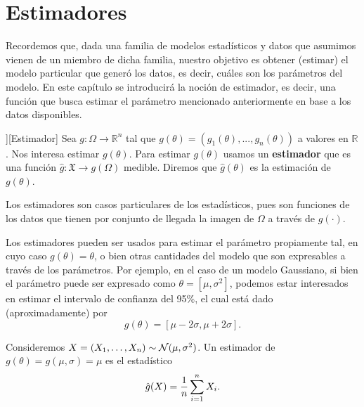\chapter{Estimadores}

Recordemos que, dada una familia de modelos estadísticos y datos que asumimos vienen de un miembro de dicha familia, nuestro objetivo es obtener (estimar) el modelo particular que generó los datos, es decir, cuáles son los parámetros del modelo. En este capítulo se introducirá la noción de estimador, es decir, una función que busca estimar el parámetro mencionado anteriormente en base a los datos disponibles.

\begin{definition}][Estimador]
    Sea $g:\Omega\rightarrow \mathbb{R}^n$  tal que $g(\theta) = (g_1(\theta),...,g_n(\theta))$ a valores en $\mathbb{R}$. Nos interesa estimar $g(\theta)$. Para estimar $g(\theta)$ usamos un \textbf{estimador} que es una función $\hat{g}:\mathfrak{X}\rightarrow g(\Omega)$ medible. Diremos que $\hat{g}(\theta)$ es la estimación de $g(\theta)$. 
    
\end{definition}

\begin{remark}
    Los estimadores son casos particulares de los estadísticos, pues son funciones de los datos que tienen por conjunto de llegada la imagen de $\Omega$ a través de $g(\cdot)$.
\end{remark}

\begin{remark}
    Los estimadores pueden ser usados para estimar el parámetro propiamente tal, en cuyo caso $g(\theta)=\theta$, o bien otras cantidades del modelo que son expresables a través de los parámetros. Por ejemplo, en el caso de un modelo Gaussiano, si bien el parámetro puede ser expresado como $\theta = [\mu,\sigma^2]$, podemos estar interesados en estimar el intervalo de confianza del 95\%, el cual está dado (aproximadamente) por 
    \begin{equation}
        g(\theta) = [\mu - 2\sigma,\mu + 2\sigma].
    \end{equation}
\end{remark}

\begin{example}
	\label{ex:estimador_media}
	Consideremos $X = (X_1,\ldots,X_n)\sim{\mathcal N}(\mu,\sigma^2)$. Un estimador de $g(\theta) = g(\mu,\sigma) = \mu$ es el estadístico 
	\begin{equation}
	\nonumber
		{ \hat{g}}(X) = \frac{1}{n}\sum_{i=1}^nX_i.
	\end{equation} 
\end{example}



